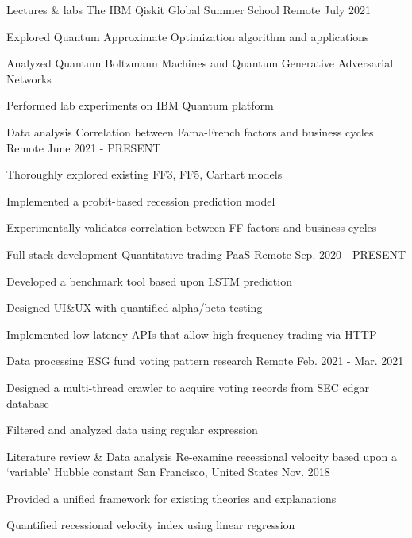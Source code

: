 \begin{cventries}
  \cventry
    {Lectures \& labs}
    {The IBM Qiskit Global Summer School}
    {Remote}
    {July 2021}
    {
      \begin{cvitems}
        \item {Explored Quantum Approximate Optimization algorithm and applications}
        \item {Analyzed Quantum Boltzmann Machines and Quantum Generative Adversarial Networks}
        \item {Performed lab experiments on IBM Quantum platform}
      \end{cvitems}
    }

  \cventry
    {Data analysis}
    {Correlation between Fama-French factors and business cycles}
    {Remote}
    {June 2021 - PRESENT}
    {
      \begin{cvitems}
        \item {Thoroughly explored existing FF3, FF5, Carhart models}
        \item {Implemented a probit-based recession prediction model}
        \item {Experimentally validates correlation between FF factors and business cycles}
      \end{cvitems}
    }

  \cventry
    {Full-stack development}
    {Quantitative trading PaaS}
    {Remote}
    {Sep. 2020 - PRESENT}
    {
      \begin{cvitems}
        \item {Developed a benchmark tool based upon LSTM prediction}
        \item {Designed UI\&UX with quantified alpha/beta testing}
        \item {Implemented low latency APIs that allow high frequency trading via HTTP}
      \end{cvitems}
    }

  \cventry
    {Data processing}
    {ESG fund voting pattern research}
    {Remote}
    {Feb. 2021 - Mar. 2021}
    {
      \begin{cvitems}
        \item {Designed a multi-thread crawler to acquire voting records from SEC edgar database}
        \item {Filtered and analyzed data using regular expression}
      \end{cvitems}
    }

  \cventry
    {Literature review \& Data analysis}
    {Re-examine recessional velocity based upon a `variable' Hubble constant}
    {San Francisco, United States}
    {Nov. 2018}
    {
      \begin{cvitems}
        \item {Provided a unified framework for existing theories and explanations}
        \item {Quantified recessional velocity index using linear regression}
      \end{cvitems}
    }


\end{cventries}
